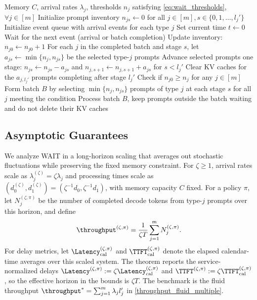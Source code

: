 \begin{algorithm}[h]
\caption{WAIT: Waiting for Accumulated Inference Threshold}
\label{alg:wait}
{\small\linespread{1.0}\selectfont
\begin{algorithmic}[1]
\Require Memory $C$, arrival rates $\lambda_j$, thresholds $n_j$ satisfying \eqref{eq:wait_thresholds}, $\forall j \in [m]$
\State Initialize prompt inventory $n_{js} \gets 0$ for all $j \in [m], s \in \{0, 1, \dots, l_j'\}$
\State Initialize event queue with arrival events for each type $j$
\State Set current time $t \gets 0$
    \State Wait for the next event (arrival or batch completion)
        \State Update inventory: $n_{j0} \gets n_{j0} + 1$  
        \State For each $j$ in the completed batch and stage $s$, let $a_{js}\gets \min\{n_j,n_{js}\}$ be the selected type-$j$ prompts
        \State Advance selected prompts one stage: $n_{js}\gets n_{js}-a_{js}$ and $n_{j,s+1}\gets n_{j,s+1}+a_{js}$ for $s<l_j'$
        \State Clear KV caches for the $a_{j,l_j'}$ prompts completing after stage $l_j'$  
    \EndIf
    \State Check if $n_{j0} \geq n_j$ for any $j \in [m]$  
        \State Form batch $B$ by selecting $\min\{n_j, n_{js}\}$ prompts of type $j$ at each stage $s$ for all $j$ meeting the condition
        \State Process batch $B$, keep prompts outside the batch waiting and do not delete their KV caches
    \EndIf
\EndWhile
\end{algorithmic}
}
\end{algorithm}

\subsection{Asymptotic Guarantees}
\label{subsec:asymptotic_analysis}
\label{subsec:main_theorem}
We analyze WAIT in a long-horizon scaling that averages out stochastic fluctuations while preserving the fixed memory constraint. For \(\zeta\ge 1\), arrival rates scale as \(\lambda_j^{(\zeta)}=\zeta\lambda_j\) and processing times scale as \((d_0^{(\zeta)},d_1^{(\zeta)})=(\zeta^{-1}d_0,\zeta^{-1}d_1)\), with memory capacity \(C\) fixed. For a policy \(\pi\), let \(N_j^{(\zeta,\pi)}\) be the number of completed decode tokens from type-\(j\) prompts over this horizon, and define
\[
\throughput^{(\zeta, \pi)} = \frac{1}{\zeta T} \sum_{j=1}^m N_j^{(\zeta, \pi)}.
\]
For delay metrics, let \(\Latency_{\rm cal}^{(\zeta,\pi)}\) and \(\TTFT_{\rm cal}^{(\zeta,\pi)}\) denote the elapsed calendar-time averages over this scaled system. The theorem reports the service-normalized delays \(\Latency^{(\zeta,\pi)}:=\zeta\Latency_{\rm cal}^{(\zeta,\pi)}\) and \(\TTFT^{(\zeta,\pi)}:=\zeta\TTFT_{\rm cal}^{(\zeta,\pi)}\), so the effective horizon in the bounds is \(\zeta T\). The benchmark is the fluid throughput \(\throughput^*=\sum_{j=1}^m \lambda_j l_j'\) in \eqref{throughput_fluid_multiple}.

